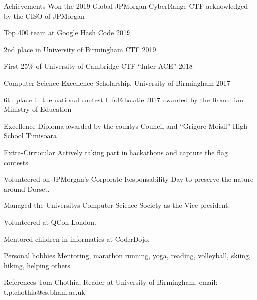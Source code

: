 \documentclass{resume} %
\newcommand{\quotes}[1]{``#1''}
\begin{document}
\begin{rSection}{Achievements} 
Won the 2019 Global JPMorgan CyberRange CTF acknowledged by the CISO of JPMorgan
\item Top 400 team at Google Hash Code 2019 
\item 2nd place in University of Birmingham CTF 2019
\item First 25\% of University of Cambridge CTF \quotes{Inter-ACE} 2018
\item Computer Science Excellence Scholarship, University of Birmingham 2017
\item 6th place in the national contest InfoEducatie 2017 awarded by the Romanian Ministry of Education
\item Excellence Diploma awarded by the county\textsc{}s Council and \quotes{Grigore Moisil} High School Timisoara \\
\end{rSection}


\begin{rSection}{Extra-Cirrucular} \itemsep -3pt
Actively taking part in hackathons and capture the flag contests.
\item Volunteered on JPMorgan's Corporate Responsability Day to preserve the nature around Dorset.
\item Managed the University\textsc{}s Computer Science Society as the Vice-president.
\item Volunteered at QCon London.
\item Mentored children in informatics at CoderDojo.\\

\end{rSection}

\begin{rSection}{Personal hobbies}
Mentoring, marathon running, yoga, reading, volleyball, skiing, hiking, helping others\\
\end{rSection}

\begin{rSection}{References}
Tom Chothia, Reader at University of Birmingham, email: t.p.chothia@cs.bham.ac.uk
\end{rSection}
\end{document}
